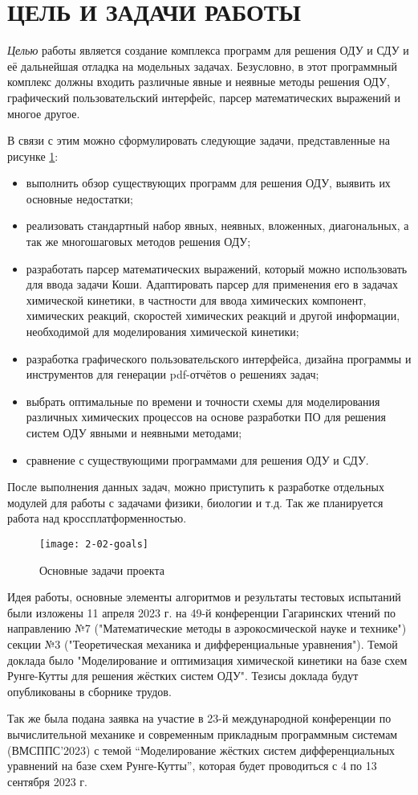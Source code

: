 \section{ЦЕЛЬ И ЗАДАЧИ РАБОТЫ} %

\textit{Целью} работы является создание комплекса программ для решения ОДУ и СДУ и её дальнейшая отладка на модельных задачах.
Безусловно, в этот программный комплекс должны входить различные явные и неявные методы решения ОДУ, графический
пользовательский интерфейс, парсер математических выражений и многое другое.

В связи с этим можно сформулировать следующие задачи, представленные на рисунке \ref{fig:goals}:
\begin{itemize}
    \item выполнить обзор существующих программ для решения ОДУ, выявить их основные недостатки;
    \item реализовать стандартный набор явных, неявных, вложенных, диагональных, а так же многошаговых методов решения ОДУ;
    \item разработать парсер математических выражений, который можно использовать для ввода задачи Коши. Адаптировать парсер для
    применения его в задачах химической кинетики, в частности для ввода химических компонент, химических реакций, скоростей
    химических реакций и другой информации, необходимой для моделирования химической кинетики;
    \item разработка графического пользовательского интерфейса, дизайна программы и инструментов для генерации pdf-отчётов о решениях
    задач;
    \item выбрать оптимальные по времени и точности схемы для моделирования различных химических процессов на основе разработки ПО
    для решения систем ОДУ явными и неявными методами;
    \item сравнение с существующими программами для решения ОДУ и СДУ.
\end{itemize}

После выполнения данных задач, можно приступить к разработке отдельных модулей для работы с задачами физики, биологии и т.д. Так же
планируется работа над кроссплатформенностью.

\begin{figure}
    \texttt{[image: 2-02-goals]}
    \caption{Основные задачи проекта}
    \label{fig:goals}
\end{figure}

Идея работы, основные элементы алгоритмов и результаты тестовых испытаний были изложены 11 апреля 2023 г. на 49-й конференции
Гагаринских чтений
по направлению №7 ("Математические методы в аэрокосмической науке и технике")
секции №3 ("Теоретическая механика и дифференциальные уравнения"). Темой доклада было "Моделирование и оптимизация химической кинетики
на базе схем Рунге-Кутты для решения жёстких систем ОДУ". Тезисы доклада будут опубликованы в сборнике трудов.

Так же была подана заявка на участие в 23-й международной конференции по вычислительной механике и современным прикладным
программным системам (ВМСППС'2023) с темой “Моделирование жёстких систем дифференциальных уравнений на базе схем Рунге-Кутты”,
которая будет проводиться с 4 по 13 сентября 2023 г. 